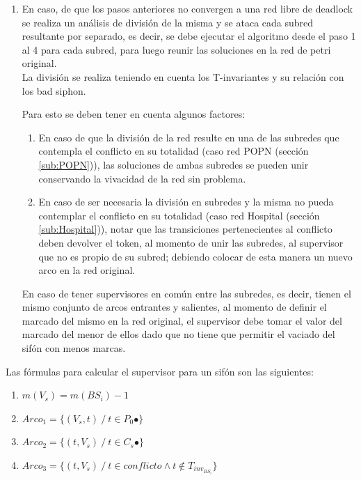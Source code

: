\begin{enumerate}
    \item En caso, de que los pasos anteriores no convergen a una red libre de deadlock se realiza un análisis de división de la misma y se ataca cada subred resultante por separado, es decir, se debe ejecutar el algoritmo desde el paso 1 al 4 para cada subred, para luego reunir las soluciones en la red de petri original. \\
    La división se realiza teniendo en cuenta los T-invariantes y su relación con los bad siphon.

    Para esto se deben tener en cuenta algunos factores:        
    \begin{enumerate}
            \item En caso de que la división de la red resulte en una de las subredes que contempla el conflicto en su totalidad (caso red POPN (sección \ref{sub:POPN})), las soluciones de ambas subredes se pueden unir conservando la vivacidad de la red sin problema. 
            
            \item En caso de ser necesaria la división en subredes y la misma no pueda contemplar el conflicto en su totalidad (caso red Hospital (sección \ref{sub:Hospital})), notar que las transiciones pertenecientes al conflicto deben devolver el token, al momento de unir las subredes, al supervisor que no es propio de su subred; debiendo colocar de esta manera un nuevo arco en la red original. 
        \end{enumerate} %
    En caso de tener supervisores en común entre las subredes, es decir, tienen el mismo conjunto de arcos entrantes y salientes, al momento de definir el marcado del mismo en la red original, el supervisor debe tomar el valor del marcado del menor de ellos dado que no tiene que permitir el vaciado del sifón con menos marcas.
\end{enumerate}


\noindent Las fórmulas para calcular el supervisor para un sifón son las siguientes:
\begin{enumerate}
    \item $m(V_s) = m(BS_i) - 1$
    \item $Arco_1 = \{(V_s, t) \ / \ t \in P_0 \bullet \}$
    \item $Arco_2 = \{(t, V_s) \ / \ t \in C_s \bullet \}$
    \item $Arco_3 = \{(t, V_s) \ / \ t \in conflicto \wedge t \notin T_{inv_{BS_i}} \}$
\end{enumerate}


